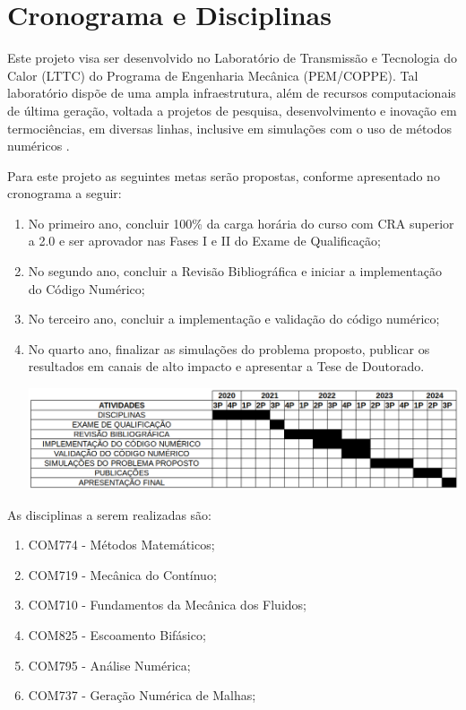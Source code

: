 \section{Cronograma e Disciplinas}

Este projeto visa ser desenvolvido no Laboratório de Transmissão e Tecnologia do Calor (LTTC) do Programa de Engenharia Mecânica (PEM/COPPE). 
Tal laboratório dispõe de uma ampla infraestrutura, 
além de recursos computacionais de última geração, 
voltada a projetos de pesquisa, desenvolvimento e inovação
em termociências, em diversas linhas, 
inclusive em simulações com o uso de métodos numéricos \cite{lttccoppe}. 

\bigskip
Para este projeto as seguintes metas serão propostas, conforme apresentado no cronograma a seguir:

\begin{enumerate}

\item No primeiro ano, concluir 100\% da carga horária do curso com CRA superior a 2.0 e ser aprovador nas Fases I e II do Exame de Qualificação;

\item No segundo ano, concluir a Revisão Bibliográfica e iniciar a implementação do Código Numérico;

\item No terceiro ano, concluir a implementação e validação do código numérico;

\item No quarto ano, finalizar as simulações do problema proposto, publicar os resultados em canais de alto impacto e apresentar a Tese de Doutorado.

\vspace{0.8cm}
\hspace{-1.2cm}
\includegraphics[scale=0.44]{figure/cronograma.png}

\end{enumerate}

\bigskip
As disciplinas a serem realizadas são:

\begin{enumerate}
\item COM774 - Métodos Matemáticos; 
\item COM719 - Mecânica do Contínuo;
\item COM710 - Fundamentos da Mecânica dos Fluidos;
\item COM825 - Escoamento Bifásico;
\item COM795 - Análise Numérica;
\item COM737 - Geração Numérica de Malhas;
\end{enumerate}
